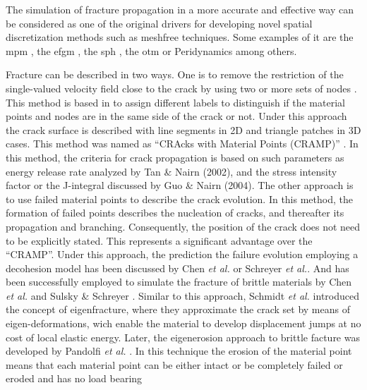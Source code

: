 \message{ !name(2020_EFM_MPM_Eigensoftening.tex)}\documentclass[preprint,12pt,a4paper]{elsarticle}
\begin{document}
The simulation of fracture propagation in a more accurate and
effective way can be considered as one of the original drivers for
developing novel spatial discretization methods such as meshfree
techniques. Some examples of it are the \acrfull{mpm}
\cite{Schreyer_2002,Chen_2002,Nairn_2003,Zhenmao_2005}, the \acrfull{efgm}  \cite{BELYTSCHKO_1995,BELYTSCHKO_2000,Zhuang_2012,Muthu_2013},
the \acrfull{sph} \cite{Wang_2020,Wang_2019},
the \acrfull{otm} \cite{Li2010,Li_2012,Pandolfi_2013,Li_2015} or Peridynamics
\cite{HA_2011,RABCZUK_2017} among others. 

Fracture can be described in two ways. One is to remove the
restriction of the single-valued velocity field close to the crack by
using two or more sets of nodes \cite{Nairn_2006}. This method is
based in to assign different labels to distinguish if the material
points and nodes are in the same side of the crack or not. Under this
approach the crack surface is described with line segments in 2D and
triangle patches in 3D cases. This method was named as ``CRAcks with
Material Points (CRAMP)'' \cite{Nairn_2003}. In this method, the
criteria for crack propagation is based on such parameters as energy
release rate analyzed by Tan \& Nairn (2002)\cite{Nairn_2002}, and the
stress intensity factor or the J-integral discussed by Guo \& Nairn 
(2004)\cite{Nairn_2004}. The other approach is to use failed material
points to describe the crack evolution. In this method, the formation
of failed points describes the nucleation of cracks, and thereafter
its propagation and branching. Consequently, the position of the crack
does not need to be explicitly stated. This represents a significant
advantage over the ``CRAMP''. Under this approach, the prediction the
failure evolution employing a decohesion model has been discussed by
Chen {\it et al.}\cite{Zhenmao_2005} or Schreyer {\it et
  al.}\cite{Schreyer_2002}. And has been successfully employed to
simulate the fracture of brittle materials by Chen {\it et al.}
\cite{Chen_2002,Chen_2003} and Sulsky \& Schreyer
\cite{Sulsky_2004}. Similar to this approach, Schmidt {\it et al.}
\cite{Schmidt_2009} introduced the concept of eigenfracture, where
they approximate the crack set by means of eigen-deformations, wich
enable the material to develop displacement jumps at no cost of local
elastic energy. Later, the eigenerosion approach to brittle facture
was developed by Pandolfi {\it et al.}
\cite{Pandolfi_2012,Pandolfi_2013}. In this technique the erosion of
the material point means that each material point can be either intact
or be completely failed or eroded and has no load bearing
\end{document}
